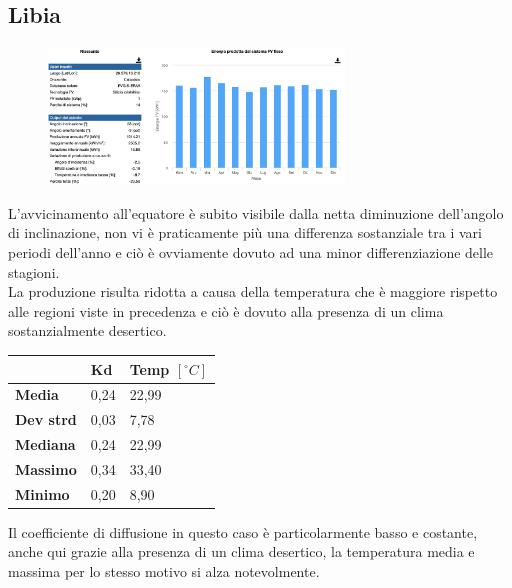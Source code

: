 \subsection{Libia}
\begin{figure}[H]
    \centering
    \includegraphics[width=0.7\textwidth]{res/cap 5/impianto libia}
\end{figure}\noindent
L'avvicinamento all'equatore è subito visibile dalla netta diminuzione dell'angolo di inclinazione, non vi è praticamente più una differenza sostanziale tra i vari periodi dell'anno e ciò è ovviamente dovuto ad una minor differenziazione delle stagioni.\\
La produzione risulta ridotta a causa della temperatura che è  maggiore rispetto alle regioni viste in precedenza e ciò è dovuto alla presenza di un clima sostanzialmente desertico.
\begin{table}[H]
    \centering
    \begin{tabular}{|l|l|l|}
    \hline
          & \textbf{Kd} & \textbf{Temp $[{}^\circ C]$} \\ \hline
        \textbf{Media} & 0,24 & 22,99 \\ \hline
        \textbf{Dev strd} & 0,03 & 7,78 \\ \hline
        \textbf{Mediana} & 0,24 & 22,99 \\ \hline
        \textbf{Massimo} & 0,34 & 33,40 \\ \hline
        \textbf{Minimo} & 0,20 & 8,90 \\ \hline
    \end{tabular}
\end{table}
Il coefficiente di diffusione in questo caso è particolarmente basso e costante, anche qui grazie alla presenza di un clima desertico, la temperatura media e massima per lo stesso motivo si alza notevolmente.
\vfill\newpage

